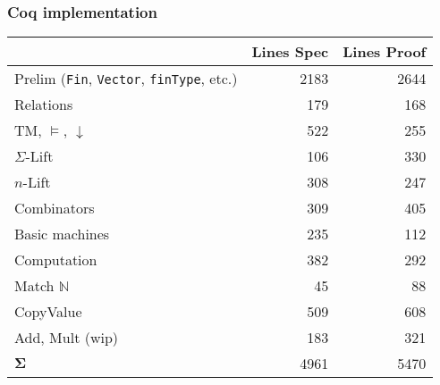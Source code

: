 \documentclass{beamer} %
\renewcommand{\VDash}{\vDash}
\renewcommand{\Nat}{\mathbb{N}}
\begin{document}
\begin{frame}
  \frametitle{Coq implementation}

  \center
  \begin{tabular}{l|r|r}
    & Lines Spec & Lines Proof \\
    \hline 
    Prelim (\texttt{Fin}, \texttt{Vector}, \texttt{finType}, etc.) & 2183 & 2644 \\
    \hline
    Relations & 179 & 168 \\
    \hline
    TM, $\VDash$, $\downarrow$ & 522 & 255 \\
    \hline
    $\Sigma$-Lift & 106 & 330 \\
    \hline
    $n$-Lift & 308 & 247 \\
    \hline
    Combinators & 309 & 405 \\
    \hline
    Basic machines & 235 & 112 \\
    \hline
    Computation & 382 & 292 \\
    \hline
    Match $\Nat$ & 45 & 88 \\
    \hline
    CopyValue & 509 & 608 \\
    \hline
    Add, Mult (wip) & 183 & 321 \\
    \hline
    $\mathbf{\Sigma}$ & 4961 & 5470 \\
  \end{tabular}

\end{frame}
\end{document}
